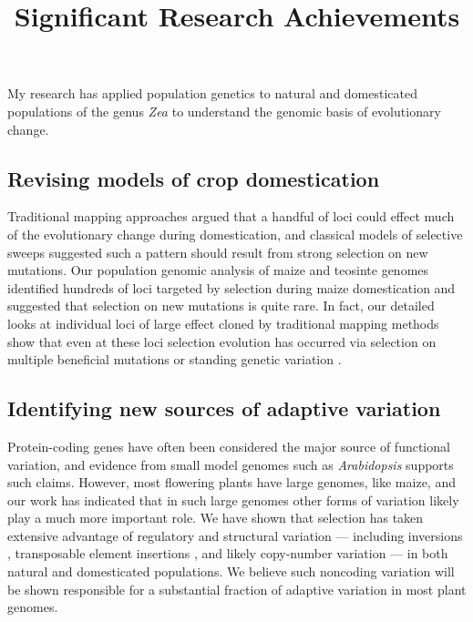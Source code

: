 \documentclass[11pt,letterpaper]{article}
\title{Significant Research Achievements}
\date{}
\begin{document}
\maketitle
\noindent

\noindent My research has applied population genetics to  natural and domesticated populations of the genus \emph{Zea} to understand the genomic basis of evolutionary change.

\subsection*{Revising models of crop domestication}
Traditional mapping approaches argued that a handful of loci could effect much of the evolutionary change during domestication, and classical models of selective sweeps suggested such a pattern should result from strong selection on new mutations. 
Our population genomic analysis of maize and teosinte genomes \citep{hufford2012comparative} identified hundreds of loci targeted by selection during maize domestication and suggested that selection on new mutations is quite rare.
In fact, our detailed looks at individual loci of large effect cloned by traditional mapping methods show that even at these loci selection evolution has occurred via selection on multiple beneficial mutations \citep{wills2013many} or standing genetic variation \citep{wills2013many, studer2011identification}.

\subsection*{Identifying new sources of adaptive variation}
Protein-coding genes have often been considered the major source of functional variation, and evidence from small model genomes such as \emph{Arabidopsis} \citep[e.g.][]{hancock2011adaptation} supports such claims. 
However, most flowering plants have large genomes, like maize, and our work has indicated that in such large genomes other forms of variation likely play a much more important role.  
We have shown that selection has taken extensive advantage of regulatory \citep{swanson2012reshaping,pyhajarvi2013complex} and structural variation --- including inversions \citep{pyhajarvi2013complex,fang2012megabase}, transposable element insertions \citep{studer2011identification,makarevitch2015transposable}, and likely copy-number variation \citep{chia2012maize} --- in both natural and domesticated populations. We believe such noncoding variation will be shown responsible for a substantial fraction of adaptive variation in most plant genomes.


%



\end{document}
